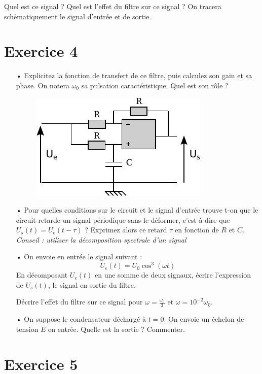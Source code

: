 \documentclass{report}
\begin{document}
Quel est ce signal ? Quel est l'effet du filtre sur ce signal ? On tracera schématiquement le signal d'entrée et de sortie.

\newpage

\section*{Exercice 4}
\begin{itemize}
\item[•] Explicitez la fonction de transfert de ce filtre, puis calculez son gain et sa phase. On notera $\omega_0$ sa pulsation caractéristique. Quel est son rôle ?
\begin{figure}[!h]
\centering
\includegraphics[width=0.5\linewidth]{circuit_.pdf}
\end{figure}

\item[•]
Pour quelles conditions sur le circuit et le signal d'entrée trouve t-on que le circuit retarde un signal périodique sans le déformer, c'est-à-dire que $U_{s}(t)=U_{e}(t-\tau)$ ? Exprimez alors ce retard $\tau$ en fonction de $R$ et $C$.
\textit{Conseil : utiliser la décomposition spectrale d'un signal}
\item[•] On envoie en entrée le signal suivant :
\begin{equation}
U_{e}(t) = U_{0}\cos^{3}(\omega t)
\end{equation}
En décomposant $U_e(t)$ en une somme de deux signaux, écrire l'expression de $U_s(t)$, le signal en sortie du filtre.

Décrire l'effet du filtre sur ce signal pour $\omega = \frac{\omega_{0}}{3}$ et $\omega=10^{-2}\omega_0$.

\item[•]
On suppose le condensateur déchargé à $t=0$. On envoie un échelon de tension $E$ en entrée. Quelle est la sortie ? Commenter.
\end{itemize}

\newpage

\section*{Exercice 5}
\end{document}
